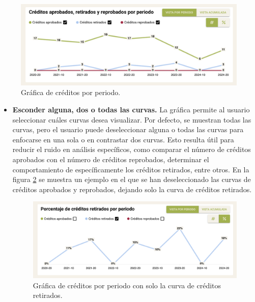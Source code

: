 \begin{figure}[H]
	\includegraphics[width=\textwidth]{assets/nes/grafica_creditos.png}
	\caption{Gráfica de créditos por periodo.}
	\label{fig:grafica_creditos}
\end{figure}

\begin{itemize}
	\item \textbf{Esconder alguna, dos o todas las curvas.} La gráfica permite al usuario seleccionar cuáles curvas desea visualizar. Por defecto, se muestran todas las curvas, pero el usuario puede deseleccionar alguna o todas las curvas para enfocarse en una sola o en contrastar dos curvas. Esto resulta útil para reducir el ruido en análisis específicos, como comparar el número de créditos aprobados con el número de créditos reprobados, determinar el comportamiento de específicamente los créditos retirados, entre otros. En la figura \ref{fig:creditos_retirados} se muestra un ejemplo en el que se han deseleccionado las curvas de créditos aprobados y reprobados, dejando solo la curva de créditos retirados.

	      \begin{figure}[H]
		      \noindent
		      \hspace{\leftmargin}
		      \begin{minipage}{\dimexpr\linewidth-\leftmargin\relax}
			      \includegraphics[width=\linewidth]{assets/nes/creditos_retirados.png}
			      \caption{Gráfica de créditos por periodo con solo la curva de créditos retirados.}
			      \label{fig:creditos_retirados}
		      \end{minipage}
	      \end{figure}


\end{itemize}
